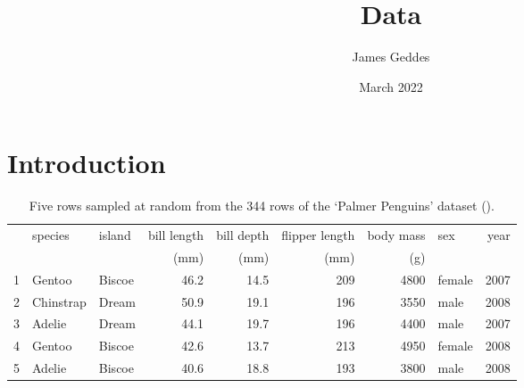 \documentclass[10pt, a4paper, twocolumn]{article}
\author{James Geddes}
\date{March 2022}
\title{Data}
\begin{document}
\maketitle
\section{Introduction}
\begin{table*}[!ht]
\centering\small
\begin{tabular}{@{}rllrrrrlr@{}}
  \toprule
 & species & island & bill length & bill depth & flipper length & body mass & sex & year \\ 
 & & & (mm) & (mm) & (mm) & (g) & &  \\ 
  \midrule
  1 & Gentoo & Biscoe & 46.2 & 14.5 & 209 & 4800 & female & 2007 \\ 
  2 & Chinstrap & Dream & 50.9 & 19.1 & 196 & 3550 & male & 2008 \\ 
  3 & Adelie & Dream & 44.1 & 19.7 & 196 & 4400 & male & 2007 \\ 
  4 & Gentoo & Biscoe & 42.6 & 13.7 & 213 & 4950 & female & 2008 \\ 
  5 & Adelie & Biscoe & 40.6 & 18.8 & 193 & 3800 & male & 2008 \\ 
  \bottomrule
\end{tabular}
\caption{Five rows sampled at random from the 344 rows of the `Palmer Penguins'
  dataset (\cite{palmerpenguins}).\label{tbl:penguins}}
\end{table*}
\end{document}
